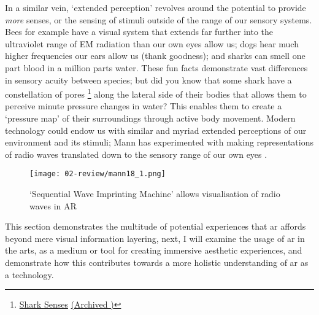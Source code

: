 In a similar vein, `extended perception' revolves around the potential to provide \textit{more} senses, or the sensing of stimuli outside of the range of our sensory systems. Bees for example have a visual system that extends far further into the ultraviolet range of EM radiation than our own eyes allow us; dogs hear much higher frequencies our ears allow us (thank goodness); and sharks can smell one part blood in a million parts water. These fun facts demonstrate vast differences in sensory acuity between species; but did you know that some shark have a constellation of pores \footnote{\href{https://www.sharktrust.org/shark-senses}{Shark Senses} \href{https://archive.today/S5It6}{(Archived \faArchive)}} along the lateral side of their bodies that allows them to perceive minute pressure changes in water? This enables them to create a `pressure map' of their surroundings through active body movement. Modern technology could endow us with similar and myriad extended perceptions of our environment and its stimuli; Mann has experimented with making representations of radio waves translated down to the sensory range of our own eyes \citeyearpar{mann2018a}.
\begin{wrapfigure}{r}{0.45\textwidth}
    \hfill
    \begin{minipage}{0.95\linewidth}
        \texttt{[image: 02-review/mann18\_1.png]}
        \captionsetup{justification=justified}
        \caption{`Sequential Wave Imprinting Machine' allows visualisation of radio waves in AR \citep[in][]{mann2018a}}\label{fig: mann_swim}
    \end{minipage}
\end{wrapfigure}

This section demonstrates the multitude of potential experiences that \gls{ar} affords beyond mere visual information layering, next, I will examine the usage of \gls{ar} in the arts, as a medium or tool for creating immersive aesthetic experiences, and demonstrate how this contributes towards a more holistic understanding of \gls{ar} as a technology. 



